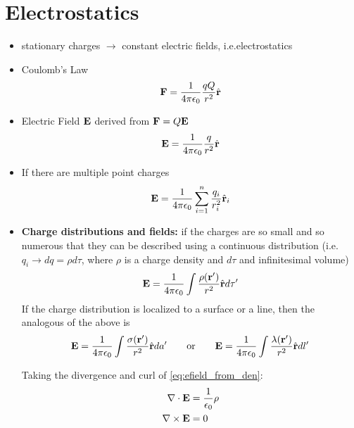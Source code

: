 \documentclass[11pt]{article}
\begin{document}
\section{Electrostatics}
\begin{itemize}

\item stationary charges $\to$ constant electric fields, i.e.\@ electrostatics

\item Coulomb's Law
\begin{equation}
\mathbf{F} = \frac{1}{4 \pi \epsilon_0} \frac{q Q}{r^2} \hat{\mathbf{r}}
\end{equation}

\item Electric Field $\mathbf{E}$ derived from $\mathbf{F} = Q\mathbf{E}$
\begin{equation}
\mathbf{E} = \frac{1}{4 \pi \epsilon_0} \frac{q}{r^2} \hat{\mathbf{r}}
\end{equation}

\item If there are multiple point charges
\begin{equation}
\mathbf{E} = \frac{1}{4 \pi \epsilon_0} \sum_{i=1}^{n} \frac{q_i}{r_i^2} \hat{\mathbf{r}}_i
\end{equation}

\item \textbf{Charge distributions and fields:} if the charges are so small and so numerous that they can be described using a continuous distribution (i.e.\@ $q_i \to dq = \rho d\tau$, where $\rho$ is a charge density and $d\tau$ and infinitesimal volume)
\begin{equation}
\mathbf{E} = \frac{1}{4 \pi \epsilon_0} \int \frac{\rho(\mathbf{r}')}{r^2} \hat{\mathbf{r}} d\tau' \label{eq:efield_from_den}
\end{equation}
If the charge distribution is localized to a surface or a line, then the analogous of the above is
\begin{equation}
    \mathbf{E} = \frac{1}{4 \pi \epsilon_0} \int \frac{\sigma(\mathbf{r}')}{r^2} \hat{\mathbf{r}} da' \qquad \text{or} \qquad \mathbf{E} = \frac{1}{4 \pi \epsilon_0} \int \frac{\lambda(\mathbf{r}')}{r^2} \hat{\mathbf{r}} dl'
\end{equation}

Taking the divergence and curl of \cref{eq:efield_from_den}:
\begin{align}
\nabla \cdot \mathbf{E} &= \frac{1}{\epsilon_0} \rho \\
\nabla \times \mathbf{E} &= 0
\end{align}


\end{itemize}
\end{document}
